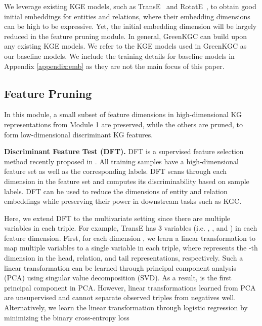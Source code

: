 \documentclass{article}
\begin{document}
We leverage existing KGE models, such as TransE~\citep{bordes2013translating} 
and RotatE~\citep{sun2018rotate}, to obtain good initial embeddings for entities
and relations, where their embedding dimensions can be high to be
expressive. Yet, the initial embedding dimension will be largely reduced
in the feature pruning module. In general, GreenKGC can build upon any
existing KGE models. We refer to the KGE models used in GreenKGC as our 
baseline models.
We include the training details for baseline models 
in Appendix \ref{appendix:emb} as they are not the main focus of this paper.



\subsection{Feature Pruning}\label{subsec:feature}

In this module, a small subset of feature dimensions in high-dimensional
KG representations from Module 1 are preserved, while the others are pruned,
to form low-dimensional discriminant KG features.

\textbf{Discriminant Feature Test (DFT).} DFT is a supervised feature
selection method recently proposed in \citet{yang2022supervised}.  All
training samples have a high-dimensional feature set as well as the
corresponding labels. DFT scans through each dimension in the feature
set and computes its discriminability based on sample labels.  DFT can
be used to reduce the dimensions of entity and relation embeddings while
preserving their power in downstream tasks such as KGC. 

Here, we extend DFT to the multivariate setting since there are
multiple variables in each triple. For example, TransE 
\citep{bordes2013translating} has 3 variables (i.e. , , and ) in 
each feature dimension. 
First, for each dimension , we learn a linear transformation  to map 
multiple variables  to a 
single variable  in each triple, where  represents the 
-th dimension in the head, relation, and tail representations, respectively. Such a linear 
transformation can be 
learned through principal component analysis (PCA) using singular value 
decomposition (SVD). As a result,  is the first principal component in PCA.
However, linear transformations learned from PCA are unsupervised and cannot 
separate observed triples from negatives well. Alternatively, we learn the linear 
transformation through logistic regression by minimizing the binary cross-entropy loss
\end{document}
